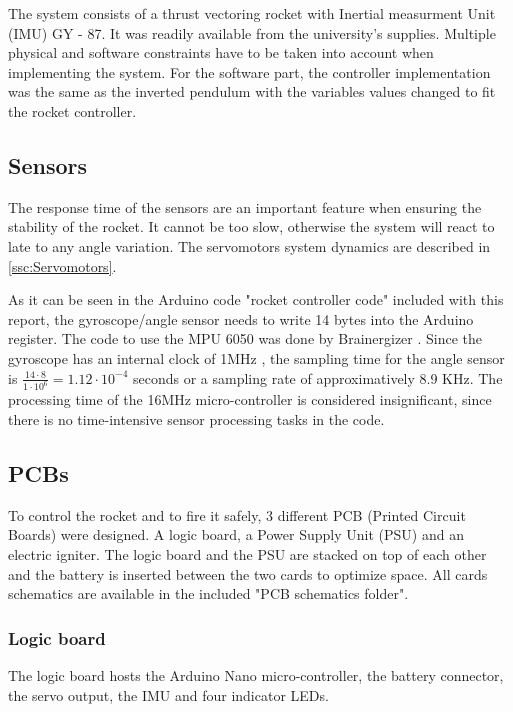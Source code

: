 The system consists of a thrust vectoring rocket with Inertial measurment Unit (IMU) GY - 87. It was readily available from the university's supplies.
Multiple physical and software constraints have to be taken into account when implementing the system. For the software part, the controller implementation was the same as the inverted pendulum with the variables values changed to fit the rocket controller.

\subsection{Sensors}
The response time of the sensors are an important feature when ensuring the stability of the rocket. It cannot be too slow, otherwise the system will react to late to any angle variation. The servomotors system dynamics are described in \autoref{ssc:Servomotors}.

As it can be seen in the Arduino code "rocket controller code" included with this report, the gyroscope/angle sensor needs to write 14 bytes into the Arduino register. The code to use the MPU 6050 was done by Brainergizer \cite{web:gyro_angle}. Since the gyroscope has an internal clock of 1MHz \cite{datasheet:MPU-6050}, the sampling time for the angle sensor is $\frac{14 \cdot 8}{1 \cdot 10^{6}} = 1.12 \cdot 10^{-4}$ seconds or a sampling rate of approximatively 8.9 KHz. The processing time of the 16MHz micro-controller is considered insignificant, since there is no time-intensive sensor processing tasks in the code.

\subsection{PCBs}
To control the rocket and to fire it safely, 3 different PCB (Printed Circuit Boards) were designed. A logic board, a Power Supply Unit (PSU) and an electric igniter. The logic board and the PSU are stacked on top of each other and the battery is inserted between the two cards to optimize space. All cards schematics are available in the included "PCB schematics folder".

\subsubsection{Logic board}
The logic board hosts the Arduino Nano micro-controller, the battery connector, the servo output, the IMU and four indicator LEDs.

